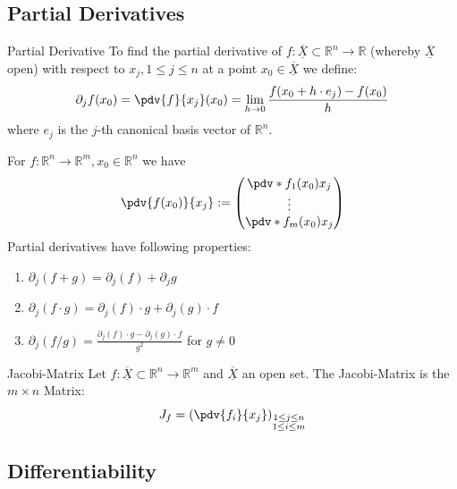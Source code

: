 \documentclass[a4paper,fontsize = 10pt]{article}
\def\R{\mathbb{R}}
\def\X{\underline{\overline{X}}}
\begin{document}
\subsection{Partial Derivatives}
\begin{mainbox}{Partial Derivative}
    To find the partial derivative of \(f: \X \subset \R^n \to \R\) (whereby \(\X\) open) with respect to $x_j, 1 \leq j \leq n$ at a point $x_0 \in \X$ we define:
\[\partial_j f (x_0)= \pdv{f}{x_{j}}(x_0) = \lim_{h \to 0} \frac{f(x_0 + h\cdot e_j) - f(x_0)}{h}\]where $e_j$ is the $j$-th canonical basis vector of $\R^n$.
\end{mainbox}
 
For \(f: \R^n \to \R^m, x_0 \in \R^n\) we have
\begin{align*}
  \pdv{f(x_0)}{x_j} := \begin{pmatrix}
    \pdv*{f_1(x_0)}{x_j}\\
    \vdots\\
    \pdv*{f_m(x_0)}{x_j}\\
  \end{pmatrix}
\end{align*}
Partial derivatives have following properties:
\begin{enumerate}
  \item \(\partial_j(f + g) = \partial_j (f) + \partial_j g\)
  \item \(\partial_j(f \cdot g) = \partial_j (f) \cdot g + \partial_j (g) \cdot f\)
  \item \(\partial_j(f / g) = \frac{\partial_j (f) \cdot g - \partial_j (g) \cdot f}{g^2}\) for \(g \ne 0\)
\end{enumerate}
\begin{mainbox}{Jacobi-Matrix}
Let \(f: \X \subset \R^n \to \R^m\) and \(\X\) an open set. The Jacobi-Matrix is the \(m \times n\) Matrix:
\[J_f = \left( \pdv{f_i}{x_j} \right)_{\substack{1 \leq j \leq n \\ 1 \leq i \leq m}}\]
\end{mainbox}


\subsection{Differentiability}
\end{document}
